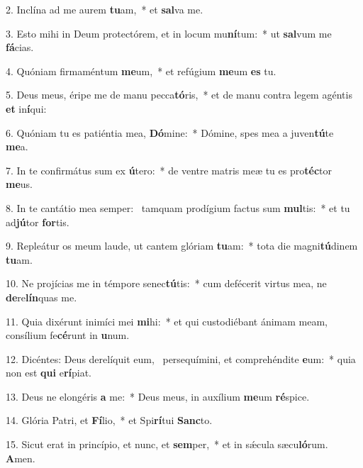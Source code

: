 2. Inclína ad me aurem \textbf{tu}am,~*  et \textbf{sal}va me.\

3. Esto mihi in Deum protectórem, et in locum mu\textbf{ní}tum:~*  ut \textbf{sal}vum me \textbf{fá}cias.\

4. Quóniam firmaméntum \textbf{me}um,~*  et refúgium \textbf{me}um \textbf{es} tu.\

5. Deus meus, éripe me de manu pecca\textbf{tó}ris,~*  et de manu contra legem agéntis \textbf{et} in\textbf{í}qui:\

6. Quóniam tu es patiéntia mea, \textbf{Dó}mine:~*  Dómine, spes mea a juven\textbf{tú}te \textbf{me}a.\

7. In te confirmátus sum ex \textbf{ú}tero:~*  de ventre matris meæ tu es pro\textbf{téc}tor \textbf{me}us.\

8. In te cantátio mea semper: \dag\  tamquam prodígium factus sum \textbf{mul}tis:~*  et tu ad\textbf{jú}tor \textbf{for}tis.\

9. Repleátur os meum laude, ut cantem glóriam \textbf{tu}am:~*  tota die magni\textbf{tú}dinem \textbf{tu}am.\

10. Ne projícias me in témpore senec\textbf{tú}tis:~*  cum defécerit virtus mea, ne \textbf{de}re\textbf{lín}quas me.\

11. Quia dixérunt inimíci mei \textbf{mi}hi:~*  et qui custodiébant ánimam meam, consílium fe\textbf{cé}runt in \textbf{u}num.\

12. Dicéntes: Deus derelíquit eum, \dag\  persequímini, et comprehéndite \textbf{e}um:~*  quia non est \textbf{qui} e\textbf{rí}piat.\

13. Deus ne elongéris \textbf{a} me:~*  Deus meus, in auxílium \textbf{me}um \textbf{ré}spice.\

14. Glória Patri, et \textbf{Fí}lio,~*  et Spi\textbf{rí}tui \textbf{Sanc}to.\

15. Sicut erat in princípio, et nunc, et \textbf{sem}per,~*  et in sǽcula sæcu\textbf{ló}rum. \textbf{A}men.\

